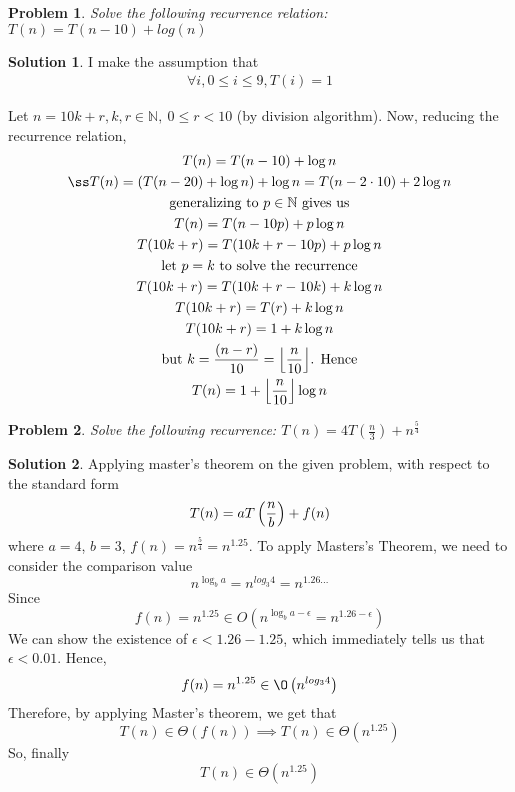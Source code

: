 \documentclass{article}
\newtheorem{problem}{Problem}
\theoremstyle{definition}
\newtheorem*{solution}{Solution}
\DeclarePairedDelimiter\floor{\lfloor}{\rfloor}
\begin{document}
\begin{problem}
Solve the following recurrence relation: $T(n) = T(n - 10) + log(n)$
\end{problem}
\begin{solution}
	I make the assumption that
	\begin{gather*}
		\forall i, 0 \leq i \leq 9, T(i) = 1
	\end{gather*}
	
	Let $n = 10k + r, k, r \in \mathbb N, \ 0 \leq r < 10$ (by division algorithm). Now, reducing the recurrence relation,
	\begin{gather*}
		T(n) = T(n - 10) + \log n \\ß
		T(n) = (T(n - 20) + \log n) + \log n = T(n - 2 \cdot 10) + 2 \log n \\
		\text{generalizing to $p \in \mathbb N$ gives us} \\
		T(n) = T(n - 10p) + p \log n  \\
		T(10k + r) = T(10k + r - 10p) + p \log n \\
		\text{let $p = k$ to solve the recurrence} \\
		T(10k + r) = T(10k + r -10k) + k \log n \\
		T(10k + r) = T(r) + k \log n \\
		T(10k + r) = 1 + k \log n \\
		\text{but $k = \frac{(n - r)}{10} = \floor*{\frac{n}{10}}$. Hence} \\
		T(n) = 1 + \floor*{\frac{n}{10}} \log n
	\end{gather*}
\end{solution}


\begin{problem}
Solve the following recurrence: $T(n) = 4T(\frac n 3) + n^{\frac 5 4}$
\end{problem}
\begin{solution}
	Applying master's theorem on the given problem, with respect to the standard form
	$$
	T(n) = aT \left( \frac{n}{b} \right) + f(n) \\
	$$
	where $a = 4$, $b = 3$, $f(n) = n^{\frac 5 4} = n^{1.25}$.
	To apply Masters's Theorem, we need to consider the comparison value
	$$n^{\log_b a} = n^{log_3 4} = n^{1.26...}$$
	Since
	$$
	f(n) = n^{1.25} \in O(n^{\log_b a - \epsilon} = n^{1.26 - \epsilon})
	$$
	We can show the existence of $\epsilon < 1.26 - 1.25$, which immediately tells us that $\epsilon < 0.01$. Hence,
	$$
	f(n) = n^{1.25} \in \O \left( n^{log_3 4} \right)
	$$
	Therefore, by applying Master's theorem, we get that 
	$$
	T(n) \in \Theta \left( f(n) \right) \implies T(n) \in \Theta \left( n^{1.25} \right)
	$$
	So, finally
	$$
	T(n) \in \Theta \left( n^{1.25} \right)
	$$
\end{solution}
\end{document}
